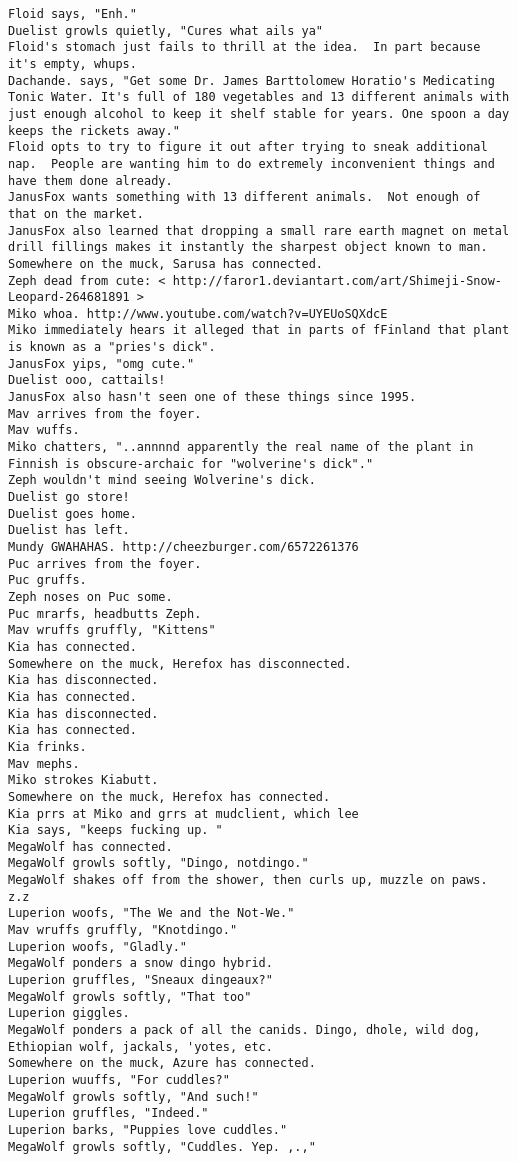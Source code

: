 \begin{verbatim}
Floid says, "Enh."
Duelist growls quietly, "Cures what ails ya"
Floid's stomach just fails to thrill at the idea.  In part because it's empty, whups.
Dachande. says, "Get some Dr. James Barttolomew Horatio's Medicating Tonic Water. It's full of 180 vegetables and 13 different animals with just enough alcohol to keep it shelf stable for years. One spoon a day keeps the rickets away."
Floid opts to try to figure it out after trying to sneak additional nap.  People are wanting him to do extremely inconvenient things and have them done already.
JanusFox wants something with 13 different animals.  Not enough of that on the market.
JanusFox also learned that dropping a small rare earth magnet on metal drill fillings makes it instantly the sharpest object known to man.
Somewhere on the muck, Sarusa has connected.
Zeph dead from cute: < http://faror1.deviantart.com/art/Shimeji-Snow-Leopard-264681891 >
Miko whoa. http://www.youtube.com/watch?v=UYEUoSQXdcE
Miko immediately hears it alleged that in parts of fFinland that plant is known as a "pries's dick".
JanusFox yips, "omg cute."
Duelist ooo, cattails!
JanusFox also hasn't seen one of these things since 1995.
Mav arrives from the foyer.
Mav wuffs.
Miko chatters, "..annnnd apparently the real name of the plant in Finnish is obscure-archaic for "wolverine's dick"."
Zeph wouldn't mind seeing Wolverine's dick.
Duelist go store!
Duelist goes home.
Duelist has left.
Mundy GWAHAHAS. http://cheezburger.com/6572261376
Puc arrives from the foyer.
Puc gruffs.
Zeph noses on Puc some.
Puc mrarfs, headbutts Zeph.
Mav wruffs gruffly, "Kittens"
Kia has connected.
Somewhere on the muck, Herefox has disconnected.
Kia has disconnected.
Kia has connected.
Kia has disconnected.
Kia has connected.
Kia frinks.
Mav mephs.
Miko strokes Kiabutt.
Somewhere on the muck, Herefox has connected.
Kia prrs at Miko and grrs at mudclient, which lee
Kia says, "keeps fucking up. "
MegaWolf has connected.
MegaWolf growls softly, "Dingo, notdingo."
MegaWolf shakes off from the shower, then curls up, muzzle on paws. z.z
Luperion woofs, "The We and the Not-We."
Mav wruffs gruffly, "Knotdingo."
Luperion woofs, "Gladly."
MegaWolf ponders a snow dingo hybrid.
Luperion gruffles, "Sneaux dingeaux?"
MegaWolf growls softly, "That too"
Luperion giggles.
MegaWolf ponders a pack of all the canids. Dingo, dhole, wild dog, Ethiopian wolf, jackals, 'yotes, etc.
Somewhere on the muck, Azure has connected.
Luperion wuuffs, "For cuddles?"
MegaWolf growls softly, "And such!"
Luperion gruffles, "Indeed."
Luperion barks, "Puppies love cuddles."
MegaWolf growls softly, "Cuddles. Yep. ,.,"

\end{verbatim}
